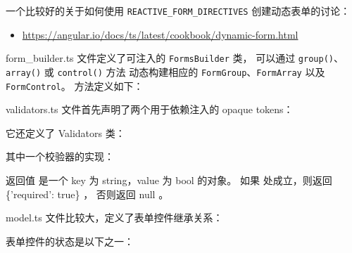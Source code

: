 一个比较好的关于如何使用 \texttt{REACTIVE\_FORM\_DIRECTIVES} 创建动态表单的讨论：

\begin{itemize}
  \item \url{https://angular.io/docs/ts/latest/cookbook/dynamic-form.html}
\end{itemize}


form\_builder.ts 文件定义了可注入的 \texttt{FormsBuilder} 类，
可以通过 \texttt{group()}、\texttt{array()} 或 \texttt{control()} 方法
动态构建相应的 \texttt{FormGroup}、\texttt{FormArray} 以及 \texttt{FormControl}。
方法定义如下：




validators.ts 文件首先声明了两个用于依赖注入的 opaque tokens：




它还定义了 Validators 类：




其中一个校验器的实现：




返回值  是一个 key 为 string，value 为 bool 的对象。
如果  处成立，则返回 \{'required': true\} ，
否则返回 null 。


model.ts 文件比较大，定义了表单控件继承关系：


表单控件的状态是以下之一：

